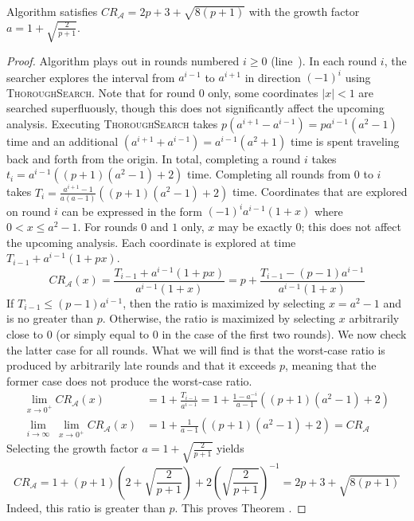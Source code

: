 \begin{theorem} 
  Algorithm  satisfies $CR_{\mathcal{A}} = 2p+3+\sqrt{8(p+1)}$ with the growth factor $a=1+\sqrt{\frac{2}{p+1}}$.
\end{theorem}
\begin{proof}
  Algorithm  plays out in rounds numbered $i\geq 0$ (line~). %
  In each round $i$, the searcher explores the interval from $a^{i-1}$ to $a^{i+1}$ in direction $(-1)^i$ using \textsc{ThoroughSearch}. Note that for round $0$ only, some coordinates $|x|<1$ are searched superfluously, though this does not significantly affect the upcoming analysis. Executing \textsc{ThoroughSearch} takes $p(a^{i+1}-a^{i-1}) = pa^{i-1}(a^2-1)$ time and an additional $(a^{i+1}+a^{i-1}) = a^{i-1}(a^2+1)$ time is spent traveling back and forth from the origin. In total, completing a round $i$ takes $t_i = a^{i-1}\left((p+1)(a^2-1)+2\right)$ time. Completing all rounds from $0$ to $i$ takes $T_i = \frac{a^{i+1}-1}{a(a-1)}\left((p+1)(a^2-1)+2\right)$ time. Coordinates that are explored on round $i$ can be expressed in the form $(-1)^ia^{i-1}\left(1+x\right)$ where $0<x\leq a^2-1$. For rounds $0$ and $1$ only, $x$ may be exactly $0$; this does not affect the upcoming analysis. Each coordinate is explored at time $T_{i-1}+a^{i-1}\left(1+px\right)$.
  \begin{equation*}
    CR_{\mathcal{A}}(x) = \frac{T_{i-1}+a^{i-1}\left(1+px\right)}{a^{i-1}(1+x)} = p + \frac{T_{i-1}-(p-1)a^{i-1}}{a^{i-1}(1+x)}
  \end{equation*}
  If $T_{i-1} \leq (p-1)a^{i-1}$, then the ratio is maximized by selecting $x=a^2-1$ and is no greater than $p$. Otherwise, the ratio is maximized by selecting $x$ arbitrarily close to $0$ (or simply equal to $0$ in the case of the first two rounds). We now check the latter case for all rounds. What we will find is that the worst-case ratio is produced by arbitrarily late rounds and that it exceeds $p$, meaning that the former case does not produce the worst-case ratio.
  \begin{align*}
    \lim_{x\to 0^+}CR_{\mathcal{A}}(x) &= 1+\frac{T_{i-1}}{a^{i-1}} = 1+\frac{1-a^{-i}}{a-1}\left((p+1)(a^2-1)+2\right) \\
    \lim_{i\to\infty}\;\lim_{x\to 0^+}CR_{\mathcal{A}}(x) &= 1+\frac{1}{a-1}\left((p+1)(a^2-1)+2\right) = CR_{\mathcal{A}}
  \end{align*}
  Selecting the growth factor $a = 1 + \sqrt{\frac{2}{p+1}}$ yields
  \begin{equation*}
    CR_{\mathcal{A}} = 1+(p+1)\left(2+\sqrt{\frac{2}{p+1}}\right)+2\left(\sqrt{\frac{2}{p+1}}\right)^{-1} = 2p+3+\sqrt{8(p+1)}
  \end{equation*}
  Indeed, this ratio is greater than $p$. This proves Theorem .
\end{proof}

